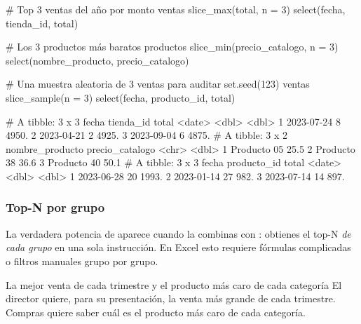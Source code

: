 \begin{rcode}
# Top 3 ventas del año por monto
ventas %
  slice_max(total, n = 3) %
  select(fecha, tienda_id, total)

# Los 3 productos más baratos
productos %
  slice_min(precio_catalogo, n = 3) %
  select(nombre_producto, precio_catalogo)

# Una muestra aleatoria de 3 ventas para auditar
set.seed(123)
ventas %
  slice_sample(n = 3) %
  select(fecha, producto_id, total)
\end{rcode}
\begin{rsalida}
# A tibble: 3 x 3
  fecha      tienda_id total
  <date>         <dbl> <dbl>
1 2023-07-24         8 4950.
2 2023-04-21         2 4925.
3 2023-09-04         6 4875.
# A tibble: 3 x 2
  nombre_producto precio_catalogo
  <chr>                     <dbl>
1 Producto 05                25.5
2 Producto 38                36.6
3 Producto 40                50.1
# A tibble: 3 x 3
  fecha      producto_id total
  <date>           <dbl> <dbl>
1 2023-06-28          20 1993.
2 2023-01-14          27  982.
3 2023-07-14          14  897.
\end{rsalida}

\subsubsection{Top-N por grupo}

La verdadera potencia de  aparece cuando la combinas con
: obtienes el top-N \emph{de cada grupo} en una sola
instrucción. En Excel esto requiere fórmulas complicadas o filtros manuales
grupo por grupo.

\begin{ejemplo}{La mejor venta de cada trimestre y el producto más caro de cada categoría}
El director quiere, para su presentación, la venta más grande de cada
trimestre. Compras quiere saber cuál es el producto más caro de cada
categoría.
\end{ejemplo}

